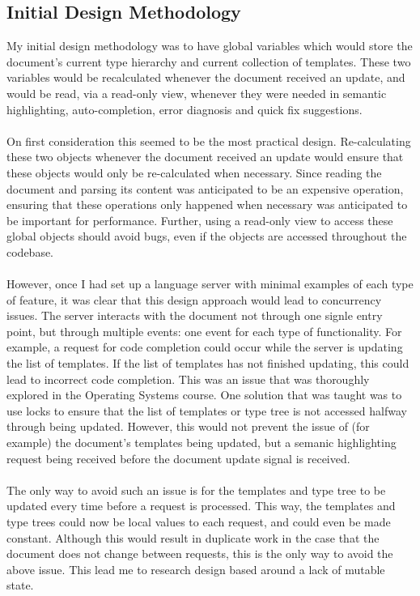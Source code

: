 \documentclass[../main.tex]{subfiles}
\begin{document}
\subsection{Initial Design Methodology}
My initial design methodology was to have global variables which would store the document's current type hierarchy and current collection of templates. These two variables would be recalculated whenever the document received an update, and would be read, via a read-only view, whenever they were needed in semantic highlighting, auto-completion, error diagnosis and quick fix suggestions. 
\\
\\
On first consideration this seemed to be the most practical design. Re-calculating these two objects whenever the document received an update would ensure that these objects would only be re-calculated when necessary. Since reading the document and parsing its content was anticipated to be an expensive operation, ensuring that these operations only happened when necessary was anticipated to be important for performance. Further, using a read-only view to access these global objects should avoid bugs, even if the objects are accessed throughout the codebase.
\\
\\
However, once I had set up a language server with minimal examples of each type of feature, it was clear that this design approach would lead to concurrency issues. The server interacts with the document not through one signle entry point, but through multiple events: one event for each type of functionality. For example, a request for code completion could occur while the server is updating the list of templates. If the list of templates has not finished updating, this could lead to incorrect code completion.
This was an issue that was thoroughly explored in the Operating Systems course. One solution that was taught was to use locks to ensure that the list of templates or type tree is not accessed halfway through being updated. However, this would not prevent the issue of (for example) the document's templates being updated, but a semanic highlighting request being received before the document update signal is received. 
\\
\\
The only way to avoid such an issue is for the templates and type tree to be updated every time before a request is processed. This way, the templates and type trees could now be local values to each request, and could even be made constant. Although this would result in duplicate work in the case that the document does not change between requests, this is the only way to avoid the above issue. This lead me to research design based around a lack of mutable state.
\end{document}
